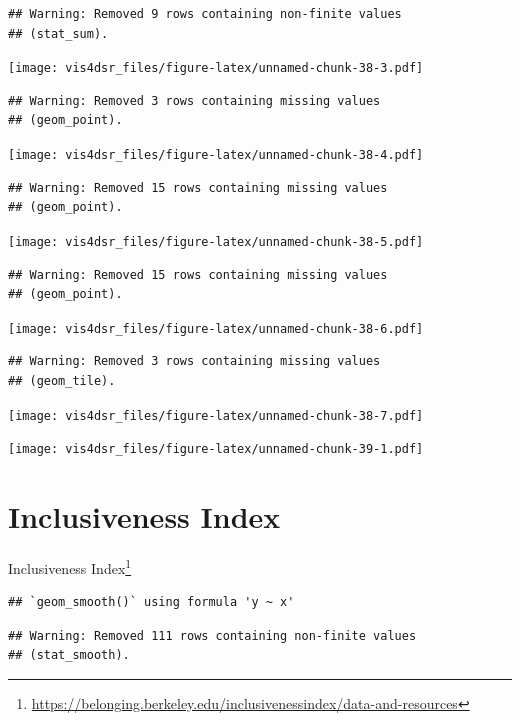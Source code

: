 \documentclass[
]{krantz}
\renewcommand{\href}[2]{#2\footnote{\url{#1}}}
\begin{document}
\begin{verbatim}
## Warning: Removed 9 rows containing non-finite values
## (stat_sum).
\end{verbatim}

\texttt{[image: vis4dsr\_files/figure-latex/unnamed-chunk-38-3.pdf]}

\begin{verbatim}
## Warning: Removed 3 rows containing missing values
## (geom_point).
\end{verbatim}

\texttt{[image: vis4dsr\_files/figure-latex/unnamed-chunk-38-4.pdf]}

\begin{verbatim}
## Warning: Removed 15 rows containing missing values
## (geom_point).
\end{verbatim}

\texttt{[image: vis4dsr\_files/figure-latex/unnamed-chunk-38-5.pdf]}

\begin{verbatim}
## Warning: Removed 15 rows containing missing values
## (geom_point).
\end{verbatim}

\texttt{[image: vis4dsr\_files/figure-latex/unnamed-chunk-38-6.pdf]}

\begin{verbatim}
## Warning: Removed 3 rows containing missing values
## (geom_tile).
\end{verbatim}

\texttt{[image: vis4dsr\_files/figure-latex/unnamed-chunk-38-7.pdf]}

\texttt{[image: vis4dsr\_files/figure-latex/unnamed-chunk-39-1.pdf]}

\hypertarget{inclusiveness-index}{%
\section*{Inclusiveness Index}\label{inclusiveness-index}}


\href{https://belonging.berkeley.edu/inclusivenessindex/data-and-resources}{Inclusiveness Index}

\begin{verbatim}
## `geom_smooth()` using formula 'y ~ x'
\end{verbatim}

\begin{verbatim}
## Warning: Removed 111 rows containing non-finite values
## (stat_smooth).
\end{verbatim}
\end{document}
